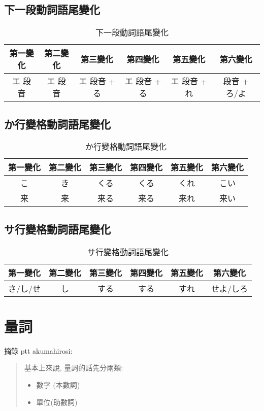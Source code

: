 \documentclass[12pt]{article}
\begin{document}
\begin{CJK}{UTF8}{cybercjk}
\subsection{下一段動詞語尾變化}
\begin{table}[htdp]
{\scriptsize
\begin{tabular}{cccccc}
\hline
第一變化 & 第二變化 & 第三變化 & 第四變化 & 第五變化 & 第六變化 \\
\hline
エ 段音 & エ 段音 & エ 段音 + る &  エ 段音 + る &  エ 段音 + れ &  段音 + ろ/よ \\
\hline
\end{tabular}
\caption{下一段動詞語尾變化}
}
\end{table}

\subsection{か行變格動詞語尾變化}
\begin{table}[htdp]
{\scriptsize
\begin{tabular}{cccccc}
\hline
第一變化 & 第二變化 & 第三變化 & 第四變化 & 第五變化 & 第六變化 \\
\hline
こ & き & くる & くる & くれ& こい \\
来 & 来 & 来る & 来る & 来れ& 来い \\
\hline
\end{tabular}
\caption{か行變格動詞語尾變化}
}
\end{table}

\subsection{サ行變格動詞語尾變化}
\begin{table}[htdp]
{\scriptsize
\begin{tabular}{cccccc}
\hline
第一變化 & 第二變化 & 第三變化 & 第四變化 & 第五變化 & 第六變化 \\
\hline
さ/し/せ & し & する & する & すれ& せよ/しろ \\
\hline
\end{tabular}
\caption{サ行變格動詞語尾變化}
}
\end{table}

\section{量詞}

摘錄 ptt akumahirosi:
\begin{quote}
  基本上來說, 量詞的話先分兩類:
  \begin{itemize}
  \item 數字 (本數詞)
  \item 單位(助數詞)
  \end{itemize}


\end{quote}
\end{CJK}
\end{document}

